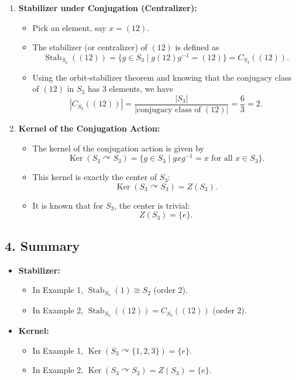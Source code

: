 \documentclass[12pt]{article}
\theoremstyle{definition} %
\theoremstyle{plain} %
\begin{document}
\begin{enumerate}[label=\textbf{Step \arabic*:}, leftmargin=*]
    \item \textbf{Stabilizer under Conjugation (Centralizer):}
    \begin{itemize}
        \item Pick an element, say \(x = (12)\).
        \item The stabilizer (or centralizer) of \((12)\) is defined as
        \[
        \operatorname{Stab}_{S_3}((12)) = \{g\in S_3 \mid g(12)g^{-1} = (12)\} = C_{S_3}((12)).
        \]
        \item Using the orbit-stabilizer theorem and knowing that the conjugacy class of \((12)\) in \(S_3\) has 3 elements, we have
        \[
        |C_{S_3}((12))| = \frac{|S_3|}{|\text{conjugacy class of } (12)|} = \frac{6}{3} = 2.
        \]
    \end{itemize}
    
    \item \textbf{Kernel of the Conjugation Action:}
    \begin{itemize}
        \item The kernel of the conjugation action is given by
        \[
        \operatorname{Ker}(S_3\curvearrowright S_3) = \{g\in S_3 \mid gxg^{-1} = x \text{ for all } x\in S_3\}.
        \]
        \item This kernel is exactly the center of \(S_3\):
        \[
        \operatorname{Ker}(S_3\curvearrowright S_3) = Z(S_3).
        \]
        \item It is known that for \(S_3\), the center is trivial:
        \[
        Z(S_3) = \{e\}.
        \]
    \end{itemize}
\end{enumerate}

\subsection*{4. Summary}
\begin{itemize}
    \item \textbf{Stabilizer:}
    \begin{itemize}
        \item In Example 1, \(\operatorname{Stab}_{S_3}(1) \cong S_2\) (order 2).
        \item In Example 2, \(\operatorname{Stab}_{S_3}((12)) = C_{S_3}((12))\) (order 2).
    \end{itemize}
    \item \textbf{Kernel:}
    \begin{itemize}
        \item In Example 1, \(\operatorname{Ker}(S_3\curvearrowright \{1,2,3\}) = \{e\}\).
        \item In Example 2, \(\operatorname{Ker}(S_3\curvearrowright S_3) = Z(S_3) = \{e\}\).
    \end{itemize}
\end{itemize}
\end{document}
